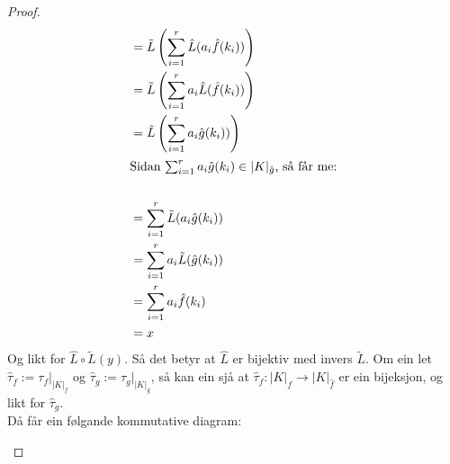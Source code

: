 \documentclass[a4paper, titlepage, 12pt, norsk]{article}
\theoremstyle{plain}
\theoremstyle{definition}
\newcommand{\Rb}{\mathbb{R}}
\begin{document}
\begin{proof}
\begin{align*}
	&= \tilde{L}\left(\sum_{i=1}^r\hat{L}(a_i\hat{f}(k_i))\right) \\
	&= \tilde{L}\left(\sum_{i=1}^ra_i\hat{L}(\hat{f}(k_i))\right) \\
	&= \tilde{L}\left(\sum_{i=1}^ra_i\hat{g}(k_i))\right) \\
	\intertext{Sidan $\sum_{i=1}^ra_i\hat{g}(k_i)\in|K|_{\hat{g}}$, så får me:} \\
	&= \sum_{i=1}^r\tilde{L}(a_i\hat{g}(k_i)) \\
	&= \sum_{i=1}^ra_i\tilde{L}(\hat{g}(k_i)) \\
	&= \sum_{i=1}^ra_i\hat{f}(k_i) \\
	&= x
\end{align*}
Og likt for $\hat{L}\circ\tilde{L}(y)$.
Så det betyr at $\hat{L}$ er bijektiv med invers $\tilde{L}$.
Om ein let $\hat{\tau}_f:=\tau_f|_{|K|_f}$ og $\hat{\tau}_g:=\tau_g|_{|K|_g}$, så kan ein sjå at $\hat{\tau}_f:|K|_f\to|K|_{\hat{f}}$ er ein bijeksjon, og likt for $\hat{\tau}_g$.
\\Då får ein følgande kommutative diagram:
\begin{center}
\end{center}

\end{proof}
\end{document}
